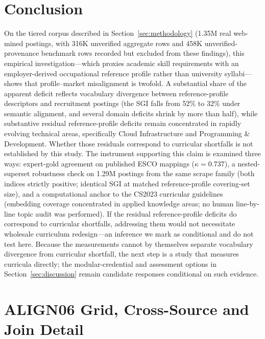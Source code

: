 \documentclass[journal]{IEEEtran}
\begin{document}
\section{Conclusion}
\label{sec:conclusion}

On the tiered corpus described in Section~\ref{sec:methodology} (1.35M real web-mined postings, with 316K unverified aggregate rows and 458K unverified-provenance benchmark rows recorded but excluded from these findings), this empirical investigation---which proxies academic skill requirements with an employer-derived occupational reference profile rather than university syllabi---shows that profile--market misalignment is twofold. A substantial share of the apparent deficit reflects vocabulary divergence between reference-profile descriptors and recruitment postings (the SGI falls from 52\% to 32\% under semantic alignment, and several domain deficits shrink by more than half), while substantive residual reference-profile deficits remain concentrated in rapidly evolving technical areas, specifically Cloud Infrastructure and Programming \& Development. Whether those residuals correspond to curricular shortfalls is not established by this study. The instrument supporting this claim is examined three ways: expert-gold agreement on published ESCO mappings ($\kappa = 0.737$), a nested-superset robustness check on 1.29M postings from the same scrape family (both indices strictly positive; identical SGI at matched reference-profile covering-set size), and a computational anchor to the CS2023 curricular guidelines (embedding coverage concentrated in applied knowledge areas; no human line-by-line topic audit was performed). If the residual reference-profile deficits do correspond to curricular shortfalls, addressing them would not necessitate wholesale curriculum redesign---an inference we mark as conditional and do not test here. Because the measurements cannot by themselves separate vocabulary divergence from curricular shortfall, the next step is a study that measures curricula directly; the modular-credential and assessment options in Section~\ref{sec:discussion} remain candidate responses conditional on such evidence.

\FloatBarrier

\appendices

\section{ALIGN06 Grid, Cross-Source and Join Detail}
\label{app:align06}
\end{document}
